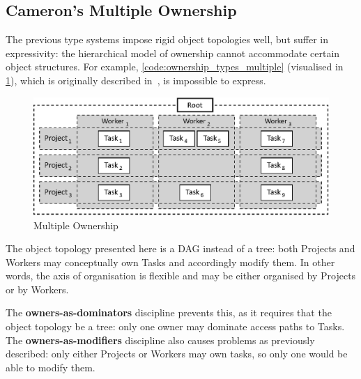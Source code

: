\documentclass{acm_proc_article-sp}
\begin{document}
%
%


\subsection{Cameron's Multiple Ownership}
\label{subsec:cameron}

The previous type systems impose rigid object topologies well, but suffer in
expressivity: the hierarchical model of ownership cannot accommodate certain
object structures. For example, \cref{code:ownership_types_multiple}
(visualised in \cref{fig:multiple-ownership}), which is originally described
in~\cite{cameron07mojo}, is impossible to express.

\begin{figure}[t]
\centering
\includegraphics{multiple-ownership.eps}
\caption{Multiple Ownership}
\label{fig:multiple-ownership}
\end{figure}

The object topology presented here is a DAG instead of a tree: both Projects and
Workers may conceptually own Tasks and accordingly modify them. In other words,
the axis of organisation is flexible and may be either organised by Projects or
by Workers.

The \textbf{owners-as-dominators} discipline prevents this, as it requires that
the object topology be a tree: only one owner may dominate access paths to
Tasks. The \textbf{owners-as-modifiers} discipline also causes problems as
previously described: only either Projects or Workers may own tasks, so only
one would be able to modify them.
\end{document}

